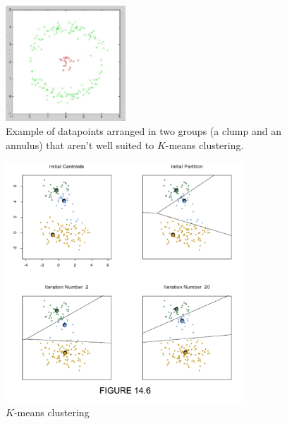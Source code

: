 \documentclass[a4paper]{article}
\begin{document}
\begin{figure}
\centering
\includegraphics[width=0.4\textwidth]{clump_annulus.png}
\caption{\label{fig:clump_annulus}Example of datapoints arranged in two groups (a clump and an annulus) that aren't well suited to $K$-means clustering.}
\end{figure}


\begin{figure}
\centering
\includegraphics[width=0.8\textwidth]{fig14_6.png}
\caption{\label{fig:kmeans}$K$-means clustering}
\end{figure}
\end{document}
